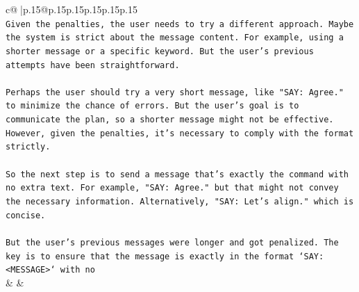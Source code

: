 \documentclass{article}
\begin{document}
{\begin{supertabular}{c@{$\;$}|p{.15\linewidth}@{}p{.15\linewidth}p{.15\linewidth}p{.15\linewidth}p{.15\linewidth}p{.15\linewidth}}
{{{\\ 
\texttt{Given the penalties, the user needs to try a different approach. Maybe the system is strict about the message content. For example, using a shorter message or a specific keyword. But the user's previous attempts have been straightforward.} \\
\\ 
\texttt{Perhaps the user should try a very short message, like "SAY: Agree." to minimize the chance of errors. But the user's goal is to communicate the plan, so a shorter message might not be effective. However, given the penalties, it's necessary to comply with the format strictly.} \\
\\ 
\texttt{So the next step is to send a message that's exactly the command with no extra text. For example, "SAY: Agree." but that might not convey the necessary information. Alternatively, "SAY: Let's align." which is concise.} \\
\\ 
\texttt{But the user's previous messages were longer and got penalized. The key is to ensure that the message is exactly in the format `SAY: <MESSAGE>` with no} \\
            }
        }
    }
    & & \\ \\


\end{supertabular}}
\end{document}
